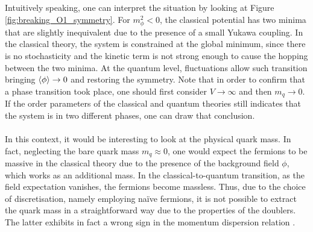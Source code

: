 Intuitively speaking, one can interpret the situation by looking at Figure \ref{fig:breaking_O1_symmetry}. For $m_\phi^2 < 0$, the classical potential has two minima that are slightly inequivalent 
due to the presence of a small Yukawa coupling. In the classical theory, the system is constrained at the global minimum, since there is no stochasticity and the kinetic term is not strong enough to cause the hopping between the two minima. At the quantum level, fluctuations allow such transition bringing $\left\langle \phi \right\rangle \to 0$ and restoring the symmetry.
Note that in order to confirm that a phase transition took place, one should first consider $V \to \infty$ and then $m_q \to 0$. If the order parameters of the classical and quantum theories still indicates that the system is 
in two different phases, one can draw that conclusion. \\~\\
In this context, it would be interesting to look at the physical quark mass. In fact, neglecting the bare quark mass $m_q \approx 0$, one would expect the fermions to be massive in the classical theory due to the presence of the background field $\phi$, which works as an additional mass. In the classical-to-quantum transition, as the field expectation vanishes, the 
fermions become massless. Thus, due to the choice of discretisation, namely employing na\"ive fermions, it is not possible to extract the quark mass in a straightforward way due to the properties of the doublers. The latter exhibits in fact a wrong sign in the momentum dispersion relation \cite{COHEN1983102,PhysRevD.101.094512}.

\newpage

